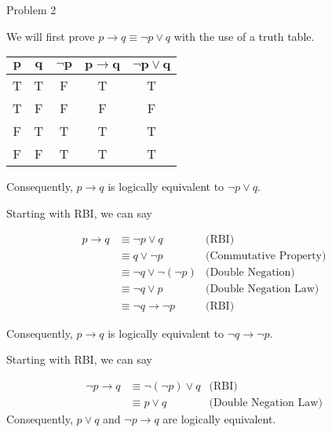 \begin{problem}{Problem 2}
    \begin{Highlight}
        We will first prove $p \rightarrow q \equiv \neg p \vee q$ with the use of a truth table.

        \begin{center}
            \begin{tabular}[h]{|c|c|c|c|c|}
                \hline $\mathbf{p}$ & $\mathbf{q}$ & $\mathbf{\neg p}$ & $\mathbf{p \rightarrow q}$ & $\mathbf{\neg p \vee q}$ \\ \hline
                T & T & F & T & T \\ \hline
                T & F & F & F & F \\ \hline
                F & T & T & T & T \\ \hline
                F & F & T & T & T \\ \hline
            \end{tabular}
        \end{center}
        Consequently, $p \rightarrow q$ is logically equivalent to $\neg p \vee q$.
    \end{Highlight}

    \begin{Highlight}
        Starting with RBI, we can say

        \begin{align*}
            p \rightarrow q & \equiv \neg p \vee q & \text{(RBI)} \\
            & \equiv q \vee \neg p & \text{(Commutative Property)} \\
            & \equiv \neg q \vee \neg (\neg p) & \text{(Double Negation)} \\
            & \equiv \neg q \vee p & \text{(Double Negation Law)} \\
            & \equiv \neg q \rightarrow \neg p & \text{(RBI)}
        \end{align*}

        Consequently, $p \rightarrow q$ is logically equivalent to $\neg q \rightarrow \neg p$.
    \end{Highlight}

    \begin{Highlight}
        Starting with RBI, we can say

        \begin{align*}
            \neg p \rightarrow q & \equiv \neg(\neg p) \vee q & \text{(RBI)} \\
            & \equiv p \vee q & \text{(Double Negation Law)}
        \end{align*}
        Consequently, $p \vee q$ and $\neg p \rightarrow q$ are logically equivalent.
    \end{Highlight}


\end{problem}
